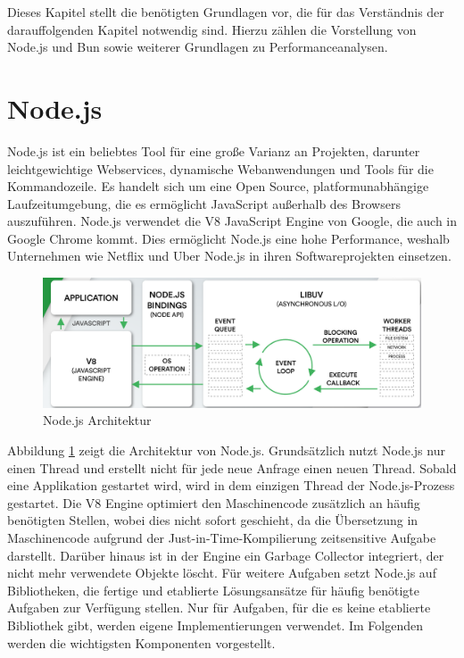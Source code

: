  \label{Grundlagen}
Dieses Kapitel stellt die benötigten Grundlagen vor, die für das Verständnis der darauffolgenden Kapitel notwendig sind. Hierzu zählen die Vorstellung von Node.js und Bun sowie weiterer Grundlagen zu Performanceanalysen.

\section{Node.js} \label{sec:Node.js}
Node.js ist ein beliebtes Tool für eine große Varianz an Projekten, darunter leichtgewichtige Webservices, dynamische Webanwendungen und Tools für die Kommandozeile. Es handelt sich um eine Open Source, platformunabhängige Laufzeitumgebung, die es ermöglicht JavaScript außerhalb des Browsers auszuführen. Node.js verwendet die V8 JavaScript Engine von Google, die auch in Google Chrome kommt. Dies ermöglicht Node.js eine hohe Performance, weshalb Unternehmen wie Netflix und Uber Node.js in ihren Softwareprojekten einsetzen. \cite{OpenJSFoundation.2022} \\

\begin{figure}[h]
	\centering
	\includegraphics[width=\linewidth]{./images/NodeJsArchitecture}
	\caption{Node.js Architektur}
	\label{fig:nodejs-architecture}
\end{figure}
 
\noindent
Abbildung \ref{fig:nodejs-architecture} zeigt die Architektur von Node.js. Grundsätzlich nutzt Node.js nur einen Thread und erstellt nicht für jede neue Anfrage einen neuen Thread. Sobald eine Applikation gestartet wird, wird in dem einzigen Thread der Node.js-Prozess gestartet. Die V8 Engine optimiert den Maschinencode zusätzlich an häufig benötigten Stellen, wobei dies nicht sofort geschieht, da die Übersetzung in Maschinencode aufgrund der Just-in-Time-Kompilierung zeitsensitive Aufgabe darstellt. Darüber hinaus ist in der Engine ein Garbage Collector integriert, der nicht mehr verwendete Objekte löscht.  \cite{Springer.2022} \newline 
Für weitere Aufgaben setzt Node.js auf Bibliotheken, die fertige und etablierte Lösungsansätze für häufig benötigte Aufgaben zur Verfügung stellen. Nur für Aufgaben, für die es keine etablierte Bibliothek gibt, werden eigene Implementierungen verwendet. Im Folgenden werden die wichtigsten Komponenten vorgestellt. \cite{Springer.2022} \\

